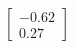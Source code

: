 \documentclass[preview]{standalone}
\begin{document}
\begin{align*}
\begin{bmatrix} -0.62 \\ 0.27 \end{bmatrix}
\end{align*}
\end{document}
